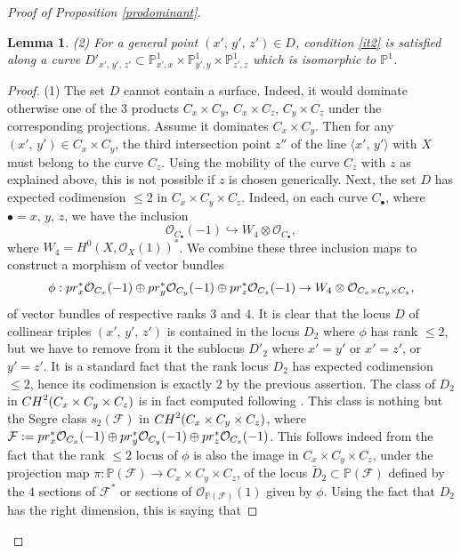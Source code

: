 \documentclass[10pt,a4paper]{amsart}
\newtheorem{lemm}{Lemma}
\begin{document}
\begin{proof}[Proof of Proposition \ref{prodominant}]
\begin{lemm}
(2) For a general point $(x',\,y',\,z')\in D$, condition \ref{it2} is satisfied along a curve $D'_{x',\,y',\,z'}\subset \mathbb{P}^1_{x',x}\times \mathbb{P}^1_{y',y}\times \mathbb{P}^1_{z',z}$ which is isomorphic to $\mathbb{P}^1$.
\end{lemm}
\begin{proof} (1) The set $D$ cannot contain a surface. Indeed, it would dominate otherwise one of the 3 products $C_x\times C_y$, $C_x\times C_z$, $C_y\times C_z$ under the corresponding projections. Assume it dominates $C_x\times C_y$. Then for any $(x',\,y')\in C_x\times C_y$, the third intersection point $z''$ of the line $\langle x',\,y'\rangle$ with $X$ must belong to the curve $C_z$. Using the mobility of  the curve $C_z$  with $z$ as explained above, this is not possible if $z$ is chosen generically. Next, the set $D$ has expected codimension $\leq 2$ in $C_x\times C_y\times C_z$. Indeed, on each curve $C_\bullet$, where  $\bullet=x,\,y,\,z$, we have
the inclusion
$$\mathcal{O}_{C_\bullet} (-1)\hookrightarrow W_4\otimes \mathcal{O}_{C_\bullet},$$
where $W_4=H^0(X,\mathcal{O}_X(1))^*$.
We combine these three inclusion maps to construct a morphism of vector bundles
\begin{eqnarray}\label{eqmophvnun}\phi: {\rm pr}_x^*\mathcal{O}_{C_x} (-1)\oplus {\rm pr}_y^*\mathcal{O}_{C_y} (-1)\oplus {\rm pr}_z^*\mathcal{O}_{C_z} (-1)\rightarrow W_4\otimes \mathcal{O}_{C_x\times C_y\times C_z},\end{eqnarray}
of vector bundles of respective ranks $3$ and $4$.
It is clear that the locus $D$ of collinear triples $(x',\,y',\,z')$ is contained in the locus $D_2$ where $\phi$ has rank $\leq 2$, but  we have to remove from it the sublocus $D'_2$ where $x'=y'$ or $x'=z'$, or $y'=z'$. It is a standard fact that the rank locus $D_2$ has expected codimension $\leq 2$, hence its codimension is exactly $2$ by the previous assertion. The class of $D_2$ in ${\rm CH}^2(C_x\times C_y\times C_z)$ is in fact computed following \cite{fulton}. This class is nothing but the Segre class
$s_2(\mathcal{F})$ in ${\rm CH}^2(C_x\times C_y\times C_z)$, where $\mathcal{F}:={\rm pr}_x^*\mathcal{O}_{C_x} (-1)\oplus {\rm pr}_y^*\mathcal{O}_{C_y} (-1)\oplus {\rm pr}_z^*\mathcal{O}_{C_z} (-1)$. This follows indeed from  the fact that the rank $\leq 2$ locus of $\phi$ is also the image in $C_x\times C_y\times C_z$, under the projection map $\pi: \mathbb{P}(\mathcal{F})\rightarrow C_x\times C_y\times C_z$, of the locus
$\widetilde{D}_2\subset \mathbb{P}(\mathcal{F})$ defined by the $4$ sections of $\mathcal{F}^*$ or sections of $\mathcal{O}_{\mathbb{P}(\mathcal{F})}(1)$ given by $ \phi$. Using the fact that $D_2$ has the right dimension, this is saying that

\end{proof}
\end{proof}
\end{document}
